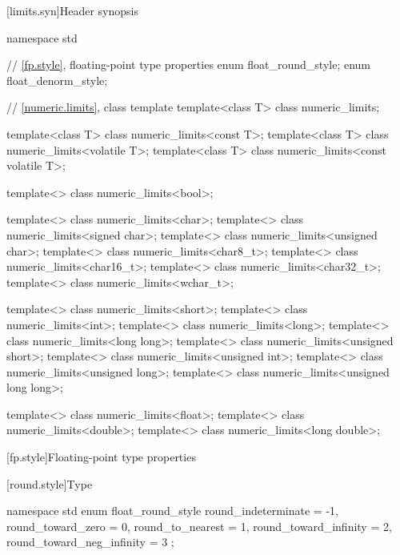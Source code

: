 [limits.syn]{Header  synopsis}

%
%
%
%
%

\begin{codeblock}
namespace std {
  // \ref{fp.style}, floating-point type properties
  enum float_round_style;
  enum float_denorm_style;

  // \ref{numeric.limits}, class template 
  template<class T> class numeric_limits;

  template<class T> class numeric_limits<const T>;
  template<class T> class numeric_limits<volatile T>;
  template<class T> class numeric_limits<const volatile T>;

  template<> class numeric_limits<bool>;

  template<> class numeric_limits<char>;
  template<> class numeric_limits<signed char>;
  template<> class numeric_limits<unsigned char>;
  template<> class numeric_limits<char8_t>;
  template<> class numeric_limits<char16_t>;
  template<> class numeric_limits<char32_t>;
  template<> class numeric_limits<wchar_t>;

  template<> class numeric_limits<short>;
  template<> class numeric_limits<int>;
  template<> class numeric_limits<long>;
  template<> class numeric_limits<long long>;
  template<> class numeric_limits<unsigned short>;
  template<> class numeric_limits<unsigned int>;
  template<> class numeric_limits<unsigned long>;
  template<> class numeric_limits<unsigned long long>;

  template<> class numeric_limits<float>;
  template<> class numeric_limits<double>;
  template<> class numeric_limits<long double>;
}
\end{codeblock}

[fp.style]{Floating-point type properties}

[round.style]{Type }

%
\begin{codeblock}
namespace std {
  enum float_round_style {
    round_indeterminate       = -1,
    round_toward_zero         =  0,
    round_to_nearest          =  1,
    round_toward_infinity     =  2,
    round_toward_neg_infinity =  3
  };
}
\end{codeblock}

